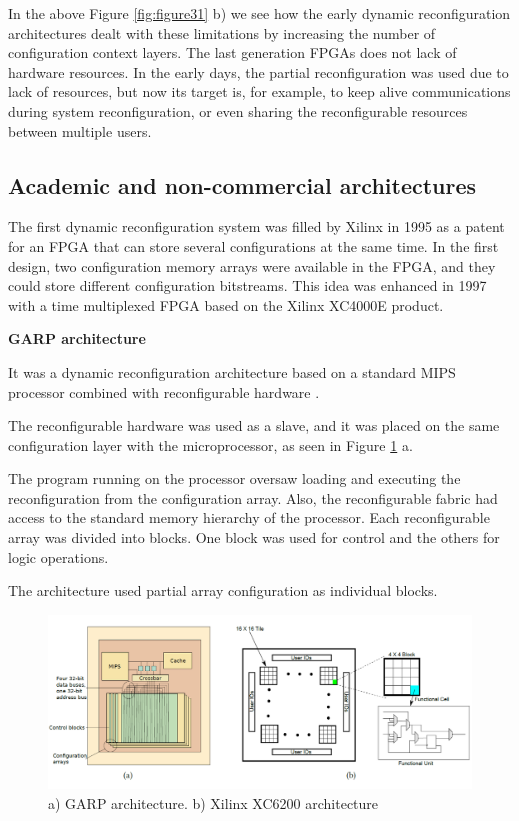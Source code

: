 \documentclass[twoside]{romjist}
\begin{document}
	\hspace{0.5cm}In the above Figure \ref{fig:figure31} b) we see how the early dynamic reconfiguration architectures dealt
	with these limitations by increasing the number of configuration context layers. The last
	generation FPGAs does not lack of hardware resources. In the early days, the partial
	reconfiguration was used due to lack of resources, but now its target is, for example, to keep
	alive communications during system reconfiguration, or even sharing the reconfigurable
	resources between multiple users.
	
	\subsection{Academic and non-commercial architectures}
	\hspace{0.5cm}
	The first dynamic reconfiguration system was filled by Xilinx in 1995 as a patent for an FPGA
	that can store several configurations at the same time. In the first design, two configuration
	memory arrays were available in the FPGA, and they could store different configuration
	bitstreams. This idea was enhanced in 1997 with a time multiplexed FPGA based on the Xilinx
	XC4000E product.
	
	\textbf{\newline GARP architecture}
	
	\hspace{0.5cm}It was a dynamic reconfiguration architecture based on a standard MIPS processor combined
	with reconfigurable hardware \cite{2}.
	
	\hspace{0.5cm}The reconfigurable hardware was used as a slave, and it was placed on the same configuration
	layer with the microprocessor, as seen in Figure \ref{fig:figure32} a.
	
	\hspace{0.5cm}The program running on the processor oversaw loading and executing the reconfiguration from
	the configuration array. Also, the reconfigurable fabric had access to the standard memory
	hierarchy of the processor. Each reconfigurable array was divided into blocks. One block was
	used for control and the others for logic operations.
	
	\hspace{0.5cm}The architecture used partial array configuration as individual blocks.
	
	\begin{figure}[h]
		\centering
		\includegraphics[width=\textwidth]{fig_3_2}
		\caption{a) GARP architecture. b) Xilinx XC6200 architecture \cite{2}}
		\label{fig:figure32}
	\end{figure}
	
\end{document}
